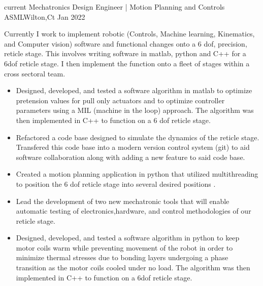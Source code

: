 \begin{experiences}

\experience
  {current}      {Mechatronics Design Engineer |  Motion Planning and Controls }{ASML}{Wilton,Ct}
  {Jan 2022} {
                  Currently I work to implement robotic (Controls, Machine learning, Kinematics, and Computer vision) software and functional changes onto a 6 dof, precision, reticle stage. This involves writing software in matlab, python and C++ for a 6dof reticle stage. I then implement the function onto a fleet of stages within a cross sectoral team. 
			\begin{itemize}
		\item Designed, developed, and tested  a software algorithm in matlab to optimize pretension values for pull only actuators and to optimize controller parameters using a MIL (machine in the loop) approach. The algorithm was then implemented in C++ to function on a 6 dof reticle stage.
	\item Refactored a code base designed to simulate the dynamics of the reticle stage. Transfered this code base into a modern version control system (git) to aid software collaboration along with adding a new feature to said code base.
                       \item Created a motion planning application in python that utilized multithreading to position the 6 dof reticle stage into several desired positions  .
		    \item Lead the development of two new mechatronic tools that will enable automatic testing of electronics,hardware, and control methodologies of our reticle stage.
		 \item Designed, developed, and tested a software algorithm in python to keep motor coils warm while preventing movement of the robot in order to minimize thermal stresses due to bonding layers undergoing a phase transition as the motor coils cooled under no load. The algorithm was then implemented in C++ to function on a 6dof reticle stage.
		

\end{itemize}}
\end{experiences}
